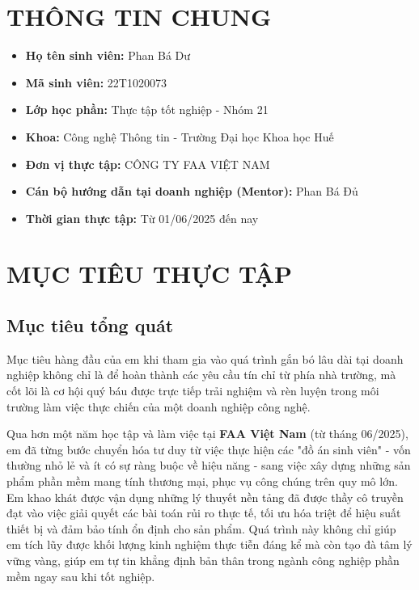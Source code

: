 \documentclass[12pt, a4paper]{article}
\begin{document}
\section{THÔNG TIN CHUNG}
\begin{itemize}
    \item \textbf{Họ tên sinh viên:} Phan Bá Dư
    \item \textbf{Mã sinh viên:} 22T1020073
    \item \textbf{Lớp học phần:} Thực tập tốt nghiệp - Nhóm 21
    \item \textbf{Khoa:} Công nghệ Thông tin - Trường Đại học Khoa học Huế
    \item \textbf{Đơn vị thực tập:} CÔNG TY FAA VIỆT NAM
    \item \textbf{Cán bộ hướng dẫn tại doanh nghiệp (Mentor):} Phan Bá Đủ
    \item \textbf{Thời gian thực tập:} Từ 01/06/2025 đến nay
\end{itemize}

\section{MỤC TIÊU THỰC TẬP}
\subsection{Mục tiêu tổng quát}
Mục tiêu hàng đầu của em khi tham gia vào quá trình gắn bó lâu dài tại doanh nghiệp không chỉ là để hoàn thành các yêu cầu tín chỉ từ phía nhà trường, mà cốt lõi là cơ hội quý báu được trực tiếp trải nghiệm và rèn luyện trong môi trường làm việc thực chiến của một doanh nghiệp công nghệ. 

Qua hơn một năm học tập và làm việc tại \textbf{FAA Việt Nam} (từ tháng 06/2025), em đã từng bước chuyển hóa tư duy từ việc thực hiện các "đồ án sinh viên" - vốn thường nhỏ lẻ và ít có sự ràng buộc về hiệu năng - sang việc xây dựng những sản phẩm phần mềm mang tính thương mại, phục vụ công chúng trên quy mô lớn. Em khao khát được vận dụng những lý thuyết nền tảng đã được thầy cô truyền đạt vào việc giải quyết các bài toán rủi ro thực tế, tối ưu hóa triệt để hiệu suất thiết bị và đảm bảo tính ổn định cho sản phẩm. Quá trình này không chỉ giúp em tích lũy được khối lượng kinh nghiệm thực tiễn đáng kể mà còn tạo đà tâm lý vững vàng, giúp em tự tin khẳng định bản thân trong ngành công nghiệp phần mềm ngay sau khi tốt nghiệp.
\end{document}
